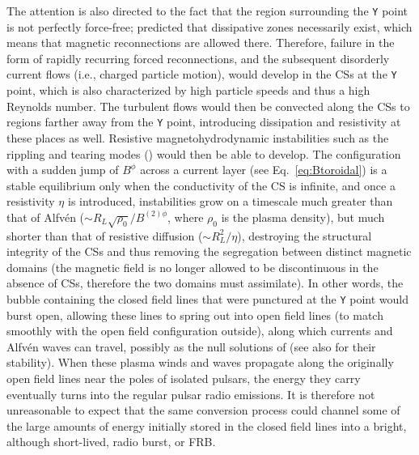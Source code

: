 \documentclass{aa}
\begin{document}
The attention is also directed to the fact that the region surrounding the \verb!Y! point is not perfectly force-free; \cite{1994MNRAS.271..621M} predicted that dissipative zones necessarily exist, which means
that magnetic reconnections are allowed there. Therefore, failure in the form of rapidly recurring forced reconnections, and the subsequent disorderly current flows (i.e., charged particle motion), would develop in the CSs at the \verb!Y! point, which is also characterized by high particle speeds and thus a high Reynolds number. The turbulent flows would then be convected along the CSs to regions farther away from the \verb!Y! point, introducing dissipation and resistivity at these places as well. 
Resistive magnetohydrodynamic instabilities such as the rippling and tearing modes (\cite{1963PhFl....6..459F}) would then be able to develop. The configuration with a sudden jump of $B^{\phi}$ across a current layer (see Eq.~\eqref{eq:Btoroidal}) is a stable equilibrium only when the conductivity of the CS is infinite, and once a resistivity $\eta$ is introduced, instabilities grow on a timescale much greater than that of Alfv\'en ($\sim R_L\sqrt{\rho_0}/B^{(2)\phi}$, where $\rho_0$ is the plasma density), but much shorter than that of resistive diffusion ($\sim R^2_L/\eta$), destroying the structural integrity of the CSs and thus removing the segregation between distinct magnetic domains (the magnetic field is no longer allowed to be discontinuous in the absence of CSs, therefore the two domains must assimilate). In other words, the bubble containing the closed field lines that were punctured at the \verb!Y! point would burst open, allowing these lines to spring out into open field lines (to match smoothly with the open field configuration outside), 
along which currents and Alfv\'en waves can travel, possibly as the null solutions of \cite{Brennan:2013jla} (see also \cite{2015PhRvD..92b4049Z} for their stability). When these plasma winds and waves propagate along the originally open field lines near the poles of isolated pulsars, the energy they carry eventually turns into the regular pulsar radio emissions. It is therefore not unreasonable to expect that the same conversion process could channel some of the large amounts of energy initially stored in the closed field lines into a bright, although short-lived, radio burst, or FRB. 
\end{document}
